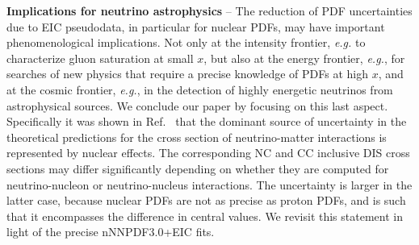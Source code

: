 \documentclass[11pt,a4paper]{article}
\newcommand{\myparagraph}[1]{\vspace{0.2cm} \noindent \textbf{#1} --}
\begin{document}
\myparagraph{Implications for neutrino astrophysics} The reduction of PDF
uncertainties due to EIC pseudodata, in particular for
nuclear PDFs, may have important phenomenological implications. Not only at the
intensity frontier, {\it e.g.} to characterize gluon saturation at small $x$,
but also at the energy frontier, {\it e.g.}, for searches of new physics that
require a precise knowledge of PDFs at high $x$, and at the cosmic frontier,
{\it e.g.}, in the detection of highly energetic neutrinos from astrophysical
sources. We conclude our paper by focusing on this last aspect. Specifically
it was shown in Ref.~\cite{Garcia:2020jwr} that the dominant source of
uncertainty in the theoretical predictions for the cross section of
neutrino-matter interactions is represented by nuclear effects.
The corresponding NC and CC inclusive DIS cross sections may differ
significantly depending on whether they are computed for neutrino-nucleon or
neutrino-nucleus interactions. The uncertainty is larger in the latter case,
because nuclear PDFs are not as precise as proton PDFs, and is such that it
encompasses the difference in central values. We revisit this statement in
light of the precise nNNPDF3.0+EIC fits.
\end{document}
